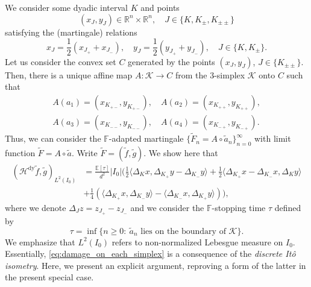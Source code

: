 \documentclass{amsart}
\newcommand{\R}{\mathbb{R}}
\newcommand{\wt}{\widetilde}
\theoremstyle{definition}
\theoremstyle{remark}
\begin{document}
We consider some dyadic interval $K$ and points
\begin{equation*}
    (x_{J},y_{J})\in\R^n\times\R^n,\quad J\in\{K,K_{\pm},K_{\pm\pm}\}
\end{equation*}
satisfying the (martingale) relations
\begin{equation*}
    x_{J}=\frac{1}{2}(x_{J_{+}}+x_{J_{-}}),\quad y_{J}=\frac{1}{2}(y_{J_{+}}+y_{J_{-}}),\quad J\in\{K,K_{\pm}\}.
\end{equation*}
Let us consider the convex set $C$ generated by the points $(x_{J},y_{J})$, $J\in\{K_{\pm\pm}\}$. Then, there is a unique affine map $A:\mathscr{K}\to C$ from the $3$-simplex $\mathscr{K}$ onto $C$ such that 
\begin{gather*}
    A(a_1)=(x_{K_{+-}},y_{K_{+-}}),\quad A(a_2)=(x_{K_{++}},y_{K_{++}}),\\
    A(a_3)=(x_{K_{--}},y_{K_{--}}),\quad A(a_4)=(x_{K_{-+}},y_{K_{-+}}).
\end{gather*}
Thus, we can consider the $\mathbb{F}$-adapted martingale $\{\wt{F}_n=A\circ\wt{a}_n\}_{n=0}^{\infty}$ with limit function $\wt{F}=A\circ\wt{a}$. Write $\wt{F}=(\wt{f},\wt{g})$. We show here that
\begin{align}
    \label{eq:damage_on_each_simplex}
    (\mathcal{H}^{\mathrm{dy}}\wt f,\wt{g})_{L^2(I_0)}&=\frac{\mathbb{E}[\tau]}{d^2}|I_0|\bigg(\frac{1}{2}\langle\Delta_{K}x,\Delta_{K_{+}}y-\Delta_{K_{-}}y\rangle
    +\frac{1}{2}\langle\Delta_{K_{+}}x-\Delta_{K_{-}}x,\Delta_{K}y\rangle\\
    \nonumber&+\frac{1}{4}(\langle\Delta_{K_{+}}x,\Delta_{K_{-}}y\rangle-\langle\Delta_{K_{-}}x,\Delta_{K_{+}}y\rangle)\bigg),
\end{align}
where we denote $\Delta_{J}z=z_{J_{+}}-z_{J_{-}}$ and we consider the $\mathbb{F}$-stopping time $\tau$ defined by
\begin{equation*}
    \tau=\inf\{n\geq0:~\wt{a}_n\text{ lies on the boundary of }\mathscr{K}\}.
\end{equation*}
 We emphasize that $L^2(I_0)$ refers to non-normalized Lebesgue measure on $I_0$. Essentially, \eqref{eq:damage_on_each_simplex} is a consequence of the \emph{discrete It{\^o} isometry}. Here, we present an explicit argument, reproving a form of the latter in the present special case.
\end{document}
